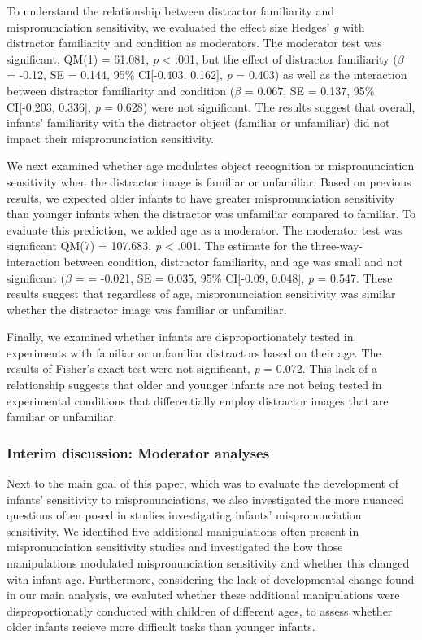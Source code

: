 \documentclass[man]{apa6}
\begin{document}
To understand the relationship between distractor familiarity and mispronunciation sensitivity, we evaluated the effect size Hedges' \emph{g} with distractor familiarity and condition as moderators. The moderator test was significant, QM(1) = 61.081, \emph{p} \textless{} .001, but the effect of distractor familiarity (\(\beta\) = -0.12, SE = 0.144, 95\% CI{[}-0.403, 0.162{]}, \emph{p} = 0.403) as well as the interaction between distractor familiarity and condition (\(\beta\) = 0.067, SE = 0.137, 95\% CI{[}-0.203, 0.336{]}, \emph{p} = 0.628) were not significant. The results suggest that overall, infants' familiarity with the distractor object (familiar or unfamiliar) did not impact their mispronunciation sensitivity.

We next examined whether age modulates object recognition or mispronunciation sensitivity when the distractor image is familiar or unfamiliar. Based on previous results, we expected older infants to have greater mispronunciation sensitivity than younger infants when the distractor was unfamiliar compared to familiar. To evaluate this prediction, we added age as a moderator. The moderator test was significant QM(7) = 107.683, \emph{p} \textless{} .001. The estimate for the three-way-interaction between condition, distractor familiarity, and age was small and not significant (\(\beta\) = = -0.021, SE = 0.035, 95\% CI{[}-0.09, 0.048{]}, \emph{p} = 0.547. These results suggest that regardless of age, mispronunciation sensitivity was similar whether the distractor image was familiar or unfamiliar.

Finally, we examined whether infants are disproportionately tested in experiments with familiar or unfamiliar distractors based on their age. The results of Fisher's exact test were not significant, \emph{p} = 0.072. This lack of a relationship suggests that older and younger infants are not being tested in experimental conditions that differentially employ distractor images that are familiar or unfamiliar.

\hypertarget{interim-discussion-moderator-analyses}{%
\subsubsection{Interim discussion: Moderator analyses}\label{interim-discussion-moderator-analyses}}

Next to the main goal of this paper, which was to evaluate the development of infants' sensitivity to mispronunciations, we also investigated the more nuanced questions often posed in studies investigating infants' mispronunciation sensitivity. We identified five additional manipulations often present in mispronunciation sensitivity studies and investigated the how those manipulations modulated mispronunciation sensitivity and whether this changed with infant age. Furthermore, considering the lack of developmental change found in our main analysis, we evaluted whether these additional manipulations were disproportionatly conducted with children of different ages, to assess whether older infants recieve more difficult tasks than younger infants.
\end{document}
